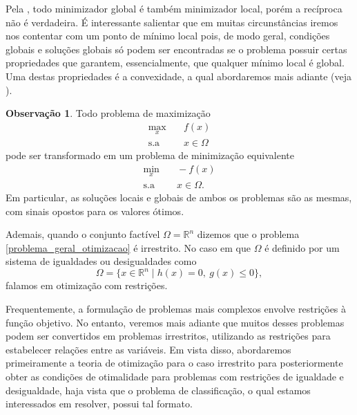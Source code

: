 \documentclass[12pt,a4paper]{scrartcl}
\def\RR{\mathds{R}}
\theoremstyle{definition}%
\newtheorem{obs}{Observação}
\begin{document}
Pela , todo minimizador global é também minimizador local, porém a recíproca não é verdadeira. É interessante salientar que em muitas circunstâncias iremos nos contentar com um ponto de mínimo local pois, de modo geral, condições globais e soluções globais só podem ser encontradas se o problema possuir certas propriedades que garantem, essencialmente, que qualquer mínimo local é global. Uma destas propriedades é a convexidade, a qual abordaremos mais adiante (veja ).

\begin{obs}
Todo problema de maximização
\[
\begin{aligned}
\max_{x} & \quad f(x) \\
\text{s.a} & \quad x \in \Omega \end{aligned}
 \]
pode ser transformado em um problema de minimização equivalente
\[
\begin{aligned}
\min_{x} & \quad -f(x) \\
\text{s.a} & \quad x \in \Omega .\end{aligned}
\]
Em particular, as soluções locais e globais de ambos os problemas são as mesmas, com sinais opostos para os valores ótimos.
\end{obs} %



Ademais, quando o conjunto factível $\Omega = \RR^{n}$ dizemos que o problema \eqref{problema_geral_otimizacao} é irrestrito. No caso em que $\Omega$ é definido por um sistema de igualdades ou desigualdades como
\[
\Omega = \{ x\in \RR^{n} \mid h(x)=0, \ g(x) \leq 0 \},
\]
falamos em otimização com restrições.

Frequentemente, a formulação de problemas mais complexos envolve restrições à função objetivo. No entanto, veremos mais adiante que muitos desses problemas podem ser convertidos em problemas irrestritos, utilizando as restrições para estabelecer relações entre as variáveis. Em vista disso, abordaremos primeiramente a teoria de otimização para o caso irrestrito para posteriormente obter as condições de otimalidade para problemas com restrições de igualdade e desigualdade, haja vista que o problema de classificação, o qual estamos interessados em resolver, possui tal formato.
\end{document}

